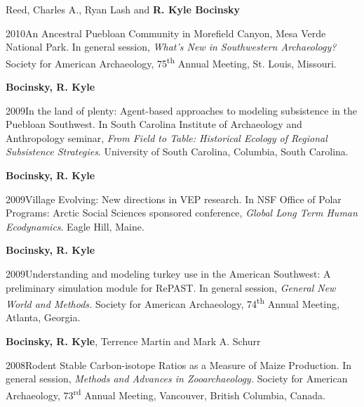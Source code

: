 Reed, Charles A., Ryan Lash and {\bf R. Kyle Bocinsky}
\nopagebreak
\begin{list1}
\item[] 2010\hspace{.2cm}An Ancestral Puebloan Community in Morefield Canyon, Mesa Verde National Park. In general session, \emph{What's New in Southwestern Archaeology?} Society for American Archaeology, 75\textsuperscript{th} Annual Meeting, St. Louis, Missouri. %
\end{list1}


{\bf Bocinsky, R. Kyle}
\nopagebreak
\begin{list1}
\item[] 2009\hspace{.2cm}In the land of plenty: Agent-based approaches to modeling subsistence in the Puebloan Southwest. In South Carolina Institute of Archaeology and Anthropology seminar, \emph{From Field to Table: Historical Ecology of Regional Subsistence Strategies}. University of South Carolina, Columbia, South Carolina.
\end{list1}


{\bf Bocinsky, R. Kyle}
\nopagebreak
\begin{list1}
\item[] 2009\hspace{.2cm}Village Evolving: New directions in VEP research. In NSF Office of Polar Programs: Arctic Social Sciences sponsored conference, \emph{Global Long Term Human Ecodynamics}. Eagle Hill, Maine.
\end{list1}


{\bf Bocinsky, R. Kyle}
\nopagebreak
\begin{list1}
\item[] 2009\hspace{.2cm}Understanding and modeling turkey use in the American Southwest: A preliminary simulation module for RePAST. In general session, \emph{General New World and Methods.} Society for American Archaeology, 74\textsuperscript{th} Annual Meeting, Atlanta, Georgia. %
\end{list1}


{\bf Bocinsky, R. Kyle}, Terrence Martin and Mark A. Schurr
\nopagebreak
\begin{list1}
\item[] 2008\hspace{.2cm}Rodent Stable Carbon-isotope Ratios as a Measure of Maize Production. In general session, \emph{Methods and Advances in Zooarchaeology.} Society for American Archaeology, 73\textsuperscript{rd} Annual Meeting, Vancouver, British Columbia, Canada. %
\end{list1}

